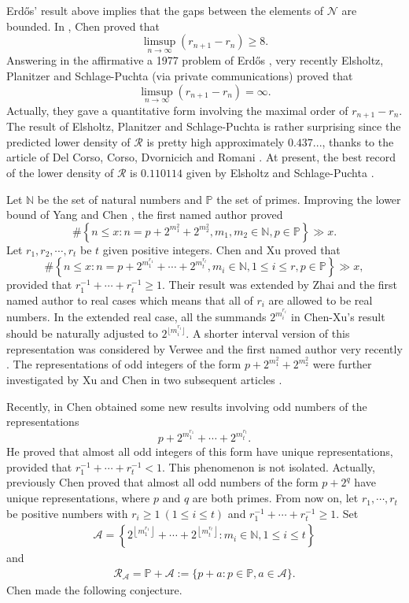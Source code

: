 \documentclass[12pt,a4paper,reqno]{amsart}
\numberwithin{equation}{section}
\theoremstyle{plain}
\theoremstyle{definition}
\begin{document}
Erd\H os' result above implies that the gaps between the elements of $\mathcal{N}$ are bounded. In \cite{Chen}, Chen proved that
$$
\limsup_{n\rightarrow\infty}(r_{n+1}-r_n)\ge 8.
$$
Answering in the affirmative a 1977 problem of Erd\H os \cite[Page 51]{Erdos-77}, very recently Elsholtz, Planitzer and Schlage-Puchta \cite{EPSP} (via private communications) proved that
$$
\limsup_{n\rightarrow\infty}(r_{n+1}-r_n)=\infty.
$$
Actually, they gave a quantitative form involving the maximal order of $r_{n+1}-r_n$. The result of Elsholtz, Planitzer and Schlage-Puchta is rather surprising since the predicted lower density of $\mathcal{R}$ is pretty high approximately $0.437...$, thanks to the article of Del Corso, Corso, Dvornicich and Romani \cite{CCDR}. At present, the best record of the lower density of $\mathcal{R}$ is $0.110114$ given by Elsholtz and Schlage-Puchta \cite{ESP}.  

Let $\mathbb{N}$ be the set of natural numbers and $\mathbb{P}$ the set of primes.
Improving the lower bound of Yang and Chen \cite{Yang-Chen}, the first named author \cite{Ding} proved 
$$
\#\left\{n\le x: n=p+2^{m_1^2}+2^{m_2^2}, m_1, m_2\in \mathbb{N}, p\in \mathbb{P}\right\}\gg x.
$$
Let $r_1,r_2,\cdots, r_t$ be $t$ given positive integers. Chen and Xu \cite{Chen-Xu} proved that
$$
\#\left\{n\le x: n=p+2^{ m_1^{r_1}}+\cdots+2^{ m_t^{r_t}}, m_i\in \mathbb{N}, 1\le i\le r, p\in \mathbb{P}\right\}\gg x,
$$
provided that $r_1^{-1}+\cdots+r_t^{-1}\ge 1$. Their result was extended by Zhai and the first named author \cite{Ding-Zhai} to real cases which means that all of $r_i$ are allowed to be real numbers. In the extended real case, all the summands $2^{m_i^{r_i}}$ in Chen-Xu's result should be naturally adjusted to $2^{\lfloor m_i^{r_i}\rfloor}$. A shorter interval version of this representation was considered by Verwee and the first named author very recently \cite{Ding-V}. The representations of odd integers of the form $p+2^{m_1^2}+2^{m_2^2}$ were further investigated by Xu and Chen in two subsequent articles \cite{Xu-Chen1,Xu-Chen2}.

Recently, in \cite{Chen-new} Chen obtained some new results involving odd numbers of the representations 
$$
p+2^{ m_1^{r_1}}+\cdots+2^{ m_t^{r_t}}.
$$
He proved that almost all odd integers of this form have unique representations, provided that $r_1^{-1}+\cdots+r_t^{-1}< 1$. This phenomenon is not isolated. Actually, previously Chen \cite{Chen-old} proved that almost all odd numbers of the form $p+2^q$ have unique representations, where $p$ and $q$ are both primes.
From now on, let $r_1,\cdots, r_t$ be positive numbers with $r_i\ge 1~(1\le i\le t)$ and $r_1^{-1}+\cdots+r_t^{-1}\ge 1$. Set
\begin{align}\label{eq-1-1}
\mathcal{A}=\left\{2^{ \left\lfloor m_1^{r_1}\right\rfloor}+\cdots+2^{\left\lfloor m_t^{r_t}\right\rfloor}: m_i\in \mathbb{N}, 1\le i\le t\right\}
\end{align}
and
\begin{align}\label{eq-1-2}
\mathcal{R}_{\mathcal{A}}=\mathbb{P}+\mathcal{A}:=\big\{p+a: p\in \mathbb{P}, a\in \mathcal{A}\big\}.
\end{align}
Chen \cite[Conjecture 1.7]{Chen-new} made the following conjecture.
\end{document}
